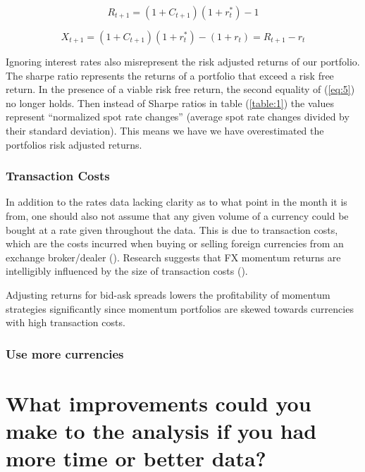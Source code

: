 \documentclass{article}
\begin{document}
\begin{equation}\label{eq:7}
    R_{t+1} = (1+C_{t+1})(1+r_{t}^{*})-1
\end{equation}

\begin{equation}\label{eq:8}
    X_{t+1} = (1+C_{t+1})(1+r_{t}^{*})-(1+r_{t}) = R_{t+1} - r_{t}
\end{equation}

Ignoring interest rates also misrepresent the risk adjusted returns of our portfolio. The sharpe ratio represents the returns of a portfolio that exceed a risk free return. In the presence of a viable risk free return, the second equality of (\ref{eq:5}) no longer holds. Then instead of Sharpe ratios in table (\ref{table:1}) the values represent “normalized spot rate changes” (average spot rate changes divided by their standard deviation). This means we have we have overestimated the portfolios risk adjusted returns.  

\subsubsection*{Transaction Costs}
In addition to the rates data lacking clarity as to what point in the month it is from, one should also not assume that any given volume of a currency could be bought at a rate given throughout the data. This is due to transaction costs, which are the costs incurred when buying or selling foreign currencies from an exchange broker/dealer (\cite{kantox}). Research suggests that FX momentum returns are intelligibly influenced by the size of transaction costs (\cite{MENKHOFF2012660}). 

Adjusting returns for bid-ask spreads lowers the profitability of momentum strategies significantly since momentum portfolios are skewed towards currencies with high transaction
costs. 


\subsubsection*{Use more currencies}


\newpage\section*{What improvements could you make	to the	analysis if	you	had	more time or better data?}

\newpage\printbibliography

\newpage\appendix 
\end{document}
